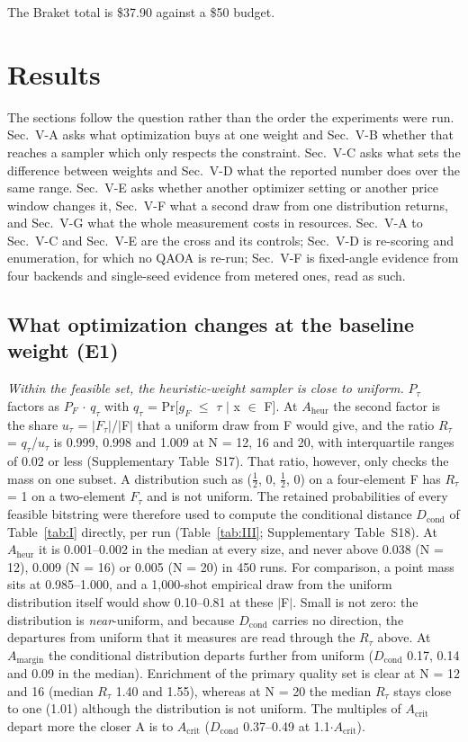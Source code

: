 \documentclass{ieeeaccess}
\begin{document}
The Braket total is \$37.90 against a \$50 budget.


\section{Results}


The sections follow the question rather than the order the experiments were run. Sec.~V-A asks what optimization buys at one weight and Sec.~V-B whether that reaches a sampler which only respects the constraint. Sec.~V-C asks what sets the difference between weights and Sec.~V-D what the reported number does over the same range. Sec.~V-E asks whether another optimizer setting or another price window changes it, Sec.~V-F what a second draw from one distribution returns, and Sec.~V-G what the whole measurement costs in resources. Sec.~V-A to Sec.~V-C and Sec.~V-E are the cross and its controls; Sec.~V-D is re-scoring and enumeration, for which no QAOA is re-run; Sec.~V-F is fixed-angle evidence from four backends and single-seed evidence from metered ones, read as such.


\subsection{What optimization changes at the baseline weight (E1)}


\textit{Within the feasible set, the heuristic-weight sampler is close to uniform.} $P_{\tau}$ factors as $P_{F}$ $\cdot$ $q_{\tau}$ with $q_{\tau}$ = Pr[$g_{F}$ $\leq$ $\tau$ $|$ x $\in$ F]. At $A_{\mathrm{heur}}$ the second factor is the share $u_{\tau}$ = $|$$F_{\tau}$$|$/$|$F$|$ that a uniform draw from F would give, and the ratio $R_{\tau}$ = $q_{\tau}$/$u_{\tau}$ is 0.999, 0.998 and 1.009 at N = 12, 16 and 20, with interquartile ranges of 0.02 or less (Supplementary Table~S17). That ratio, however, only checks the mass on one subset. A distribution such as ($\tfrac{1}{2}$, 0, $\tfrac{1}{2}$, 0) on a four-element F has $R_{\tau}$ = 1 on a two-element $F_{\tau}$ and is not uniform. The retained probabilities of every feasible bitstring were therefore used to compute the conditional distance $D_{\mathrm{cond}}$ of Table~\ref{tab:I} directly, per run (Table~\ref{tab:III}; Supplementary Table~S18). At $A_{\mathrm{heur}}$ it is 0.001--0.002 in the median at every size, and never above 0.038 (N = 12), 0.009 (N = 16) or 0.005 (N = 20) in 450 runs. For comparison, a point mass sits at 0.985--1.000, and a 1,000-shot empirical draw from the uniform distribution itself would show 0.10--0.81 at these $|$F$|$. Small is not zero: the distribution is \textit{near}-uniform, and because $D_{\mathrm{cond}}$ carries no direction, the departures from uniform that it measures are read through the $R_{\tau}$ above. At $A_{\mathrm{margin}}$ the conditional distribution departs further from uniform ($D_{\mathrm{cond}}$ 0.17, 0.14 and 0.09 in the median). Enrichment of the primary quality set is clear at N = 12 and 16 (median $R_{\tau}$ 1.40 and 1.55), whereas at N = 20 the median $R_{\tau}$ stays close to one (1.01) although the distribution is not uniform. The multiples of $A_{\mathrm{crit}}$ depart more the closer A is to $A_{\mathrm{crit}}$ ($D_{\mathrm{cond}}$ 0.37--0.49 at 1.1$\cdot$$A_{\mathrm{crit}}$).
\end{document}
